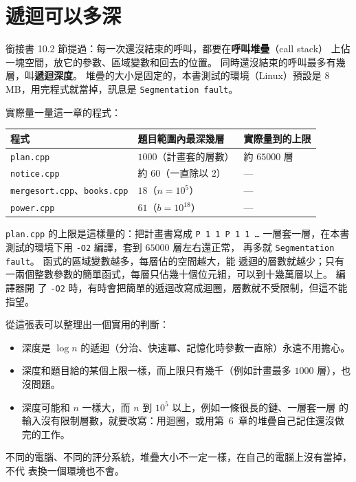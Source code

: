 \section{遞迴可以多深}
\label{sec:rec-depth}

銜接書 10.2 節提過：每一次還沒結束的呼叫，都要在\textbf{呼叫堆疊}（call stack）
上佔一塊空間，放它的參數、區域變數和回去的位置。 同時還沒結束的呼叫最多有幾
層，叫\textbf{遞迴深度}。 堆疊的大小是固定的，本書測試的環境（Linux）預設是
$8$ MB，用完程式就當掉，訊息是 \texttt{Segmentation fault}。

實際量一量這一章的程式：

\begin{center}
\begin{tabular}{lll}
\toprule
程式 & 題目範圍內最深幾層 & 實際量到的上限 \\
\midrule
\texttt{plan.cpp} & $1000$（計畫套的層數） & 約 $65000$ 層 \\
\texttt{notice.cpp} & 約 $60$（一直除以 $2$） & --- \\
\texttt{mergesort.cpp}、\texttt{books.cpp} & $18$（$n = 10^5$） & --- \\
\texttt{power.cpp} & $61$（$b = 10^{18}$） & --- \\
\bottomrule
\end{tabular}
\end{center}

\texttt{plan.cpp} 的上限是這樣量的：把計畫書寫成 \texttt{P 1 1 P 1 1 \ldots}
一層套一層，在本書測試的環境下用 \texttt{-O2} 編譯，套到 $65000$ 層左右還正常，
再多就 \texttt{Segmentation fault}。 函式的區域變數越多，每層佔的空間越大，能
遞迴的層數就越少；只有一兩個整數參數的簡單函式，每層只佔幾十個位元組，可以到十幾萬層以上。 編譯器開
了 \texttt{-O2} 時，有時會把簡單的遞迴改寫成迴圈，層數就不受限制，但這不能指望。

從這張表可以整理出一個實用的判斷：

\begin{itemize}
\item 深度是 $\log n$ 的遞迴（分治、快速冪、記憶化時參數一直除）永遠不用擔心。
\item 深度和題目給的某個上限一樣，而上限只有幾千（例如計畫最多 $1000$ 層），也
沒問題。
\item 深度可能和 $n$ 一樣大，而 $n$ 到 $10^5$ 以上，例如一條很長的鏈、一層套一層
的輸入沒有限制層數，就要改寫：用迴圈，或用第~6~章的堆疊自己記住還沒做完的工作。
\end{itemize}

不同的電腦、不同的評分系統，堆疊大小不一定一樣，在自己的電腦上沒有當掉，不代
表換一個環境也不會。


